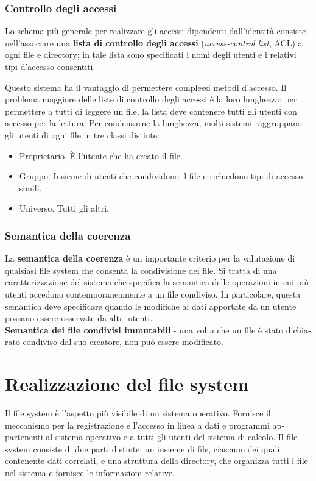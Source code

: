 \documentclass[11pt,a4paper]{article}
\begin{document}
{\subsubsection{Controllo degli accessi}
Lo schema più generale per realizzare gli accessi dipendenti dall'identità consiste
nell'associare una \textbf{lista di controllo degli accessi} (\emph{access-control list}, ACL) a ogni file e direc­tory; in tale lista sono specificati i nomi degli utenti e i relativi tipi d'accesso consentiti.

Questo sistema ha il vantaggio di permettere complessi metodi d'accesso. Il problema
maggiore delle liste di controllo degli accessi è la loro lunghezza: per permettere a tutti di
leggere un file, la lista deve contenere tutti gli utenti con accesso per la lettura. Per condensarne la lunghezza, molti sistemi raggruppano gli utenti di ogni file in tre
classi distinte:
\begin{itemize}
  \item Proprietario. È l'utente che ha creato il file.
  \item Gruppo. Insieme di utenti che condividono il file e richiedono tipi di accesso simili.
  \item Universo. Tutti gli altri.
\end{itemize}

\subsubsection{Semantica della coerenza}
La \textbf{semantica della coerenza} è un importante criterio per la valutazione di qualsiasi file
system che consenta la condivisione dei file. Si tratta di una caratterizzazione del sistema che
specifica la semantica delle operazioni in cui più utenti accedono contemporaneamente a un
file condiviso. In particolare, questa semantica deve specificare quando le modifiche ai dati
apportate da un utente possano essere osservate da altri utenti.\medskip\\
\textbf{Semantica dei file condivisi immutabili} - una volta che un file è stato dichia­rato condiviso dal suo creatore, non può essere modificato.

\section{Realizzazione del file system}
Il file system è l'aspetto più visibile di un sistema operativo. Fornisce il meccanismo per la registrazione e l'accesso in linea a dati e programmi ap­partenenti al sistema operativo e a tutti gli utenti del sistema di calcolo. Il file system consi­ste di due parti distinte: un insieme di file, ciascuno dei quali contenente dati correlati, e
una struttura della directory, che organizza tutti i file nel sistema e fornisce le informazioni
relative.

}
\end{document}

